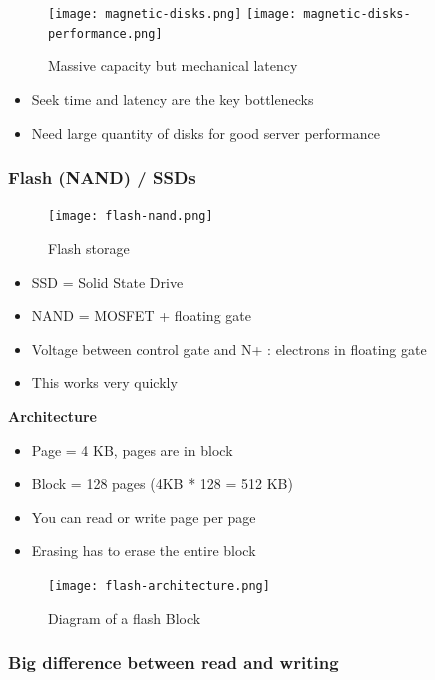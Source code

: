 \documentclass{article}
\begin{document}
\begin{figure}[H]
    \centering
    \texttt{[image: magnetic-disks.png]}
    \texttt{[image: magnetic-disks-performance.png]}
    \caption{Massive capacity but mechanical latency}
\end{figure}

\begin{itemize}
    \item Seek time and latency are the key bottlenecks
    \item Need large quantity of disks for good server performance
\end{itemize}

\subsubsection{Flash (NAND) / SSDs}

\begin{figure}[H]
    \centering
    \texttt{[image: flash-nand.png]}
    \caption{Flash storage}
\end{figure}

\begin{itemize}
    \item SSD = Solid State Drive
    \item NAND = MOSFET + floating gate
    \item Voltage between control gate and N+ : electrons in floating gate
    \item This works very quickly
\end{itemize}

\textbf{Architecture}

\begin{itemize}
    \item Page = 4 KB, pages are in block
    \item Block = 128 pages (4KB * 128 = 512 KB)
    \item You can read or write page per page
    \item Erasing has to erase the entire block
\end{itemize}

\begin{figure}[H]
    \centering
    \texttt{[image: flash-architecture.png]}
    \caption{Diagram of a flash Block}
\end{figure}


\subsubsection{Big difference between read and writing}
\end{document}
